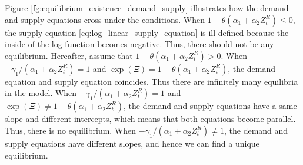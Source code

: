\documentclass[11pt, a4paper]{article}
\theoremstyle{remark}
\begin{document}
Figure \ref{fg:equilibrium_existence_demand_supply} illustrates how the demand and supply equations cross under the conditions.
When $1- \theta(\alpha_1 + \alpha_2 Z^{R}_{t}) \le 0$, the supply equation \eqref{eq:log_linear_supply_equation} is ill-defined because the inside of the log function becomes negative.
Thus, there should not be any equilibrium.
Hereafter, assume that $1- \theta(\alpha_1 + \alpha_2 Z^{R}_{t}) > 0$.
When $-\gamma_1/(\alpha_1 + \alpha_2 Z^{R}_{t}) = 1$ and $\exp(\Xi) = 1- \theta(\alpha_1 + \alpha_2 Z^{R}_{t})$, the demand equation and supply equation coincides.
Thus there are infinitely many equilibria in the model.
When $-\gamma_1/(\alpha_1 + \alpha_2 Z^{R}_{t}) = 1$ and $\exp(\Xi) \ne 1- \theta(\alpha_1 + \alpha_2 Z^{R}_{t})$, the demand and supply equations have a same slope and different intercepts, which means that both equations become parallel.
Thus, there is no equilibrium.
When $-\gamma_1/(\alpha_1 + \alpha_2 Z^{R}_{t}) \ne 1$, the demand and supply equations have different slopes, and hence we can find a unique equilibrium. 
\end{document}
